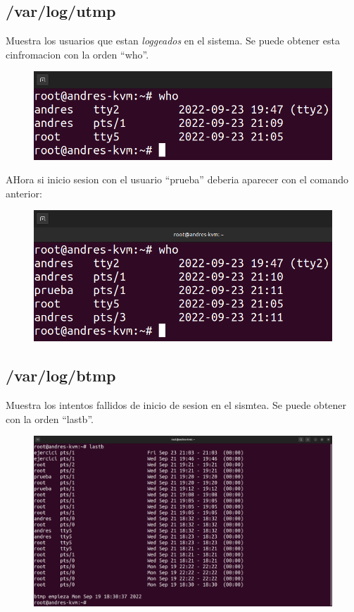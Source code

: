 \documentclass{article}
\begin{document}
\subsection{/var/log/utmp}
Muestra los usuarios que estan \textit{loggeados} en el sistema. Se puede obtener esta cinfromacion con la orden ``who''.

\begin{figure}[H]
    \includegraphics[width=\textwidth]{imagenes/whonormal.png}
\end{figure}

AHora si inicio sesion con el usuario ``prueba'' deberia aparecer con el comando anterior:

\begin{figure}[H]
    \includegraphics[width=\textwidth]{imagenes/whoprueba.png}
\end{figure}

\subsection{/var/log/btmp}
Muestra los intentos fallidos de inicio de sesion en el sismtea. Se puede obtener con la orden ``lastb''.

\begin{figure}[H]
    \includegraphics[width=\textwidth]{imagenes/lastbnormal.png}
\end{figure}
\end{document}
